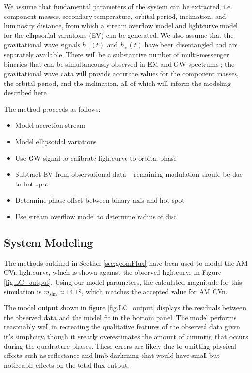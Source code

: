 \documentclass[preprint2]{aastex}
\begin{document}
We assume that fundamental parameters of the system can be extracted,
i.e. component masses, secondary temperature, orbital period,
inclination, and luminosity distance, from which a stream overflow
model and lightcurve model for the ellipsoidal variations (EV) can
be generated. We also assume that the gravitational wave signals
$h_+(t)$ and $h_\times(t)$ have been disentangled and are separately
available. There will be a substantive number of multi-messenger 
binaries that can be simultaneously observed in EM and GW spectrums 
\citep{LLCN2013}; the gravitational wave data will provide accurate 
values for the component masses, the orbital period, and the 
inclination, all of which will inform the modeling described here.

The method proceeds as follows:
\begin{itemize}
   \item Model accretion stream
   
   \item Model ellipsoidal variations
   
   \item Use GW signal to calibrate lightcurve to orbital phase
   
   \item Subtract EV from observational data -- remaining modulation
   should be due to hot-spot
   
   \item Determine phase offset between binary axis and hot-spot
   
   \item Use stream overflow model to determine radius of disc
\end{itemize}


\subsection{System Modeling}
The methods outlined in Section \ref{sec:geomFlux} have been used to model the
AM CVn lightcurve, which is shown against the observed lightcurve in
Figure \ref{fig.LC_output}.  Using our model parameters, the
calculated magnitude for this simulation is $m_{\text{sim}} \approx
14.18$, which matches the accepted value for AM CVn.  

The model output shown in figure \ref{fig.LC_output} displays the residuals between the observed data and the model fit in the bottom panel. The model performs reasonably well in recreating the qualitative features of the observed data given it's simplicity, though it greatly overestimates the amount of dimming that occurs during the quadrature phases. These errors are likely due to omitting physical effects such as reflectance and limb darkening that would have small but noticeable effects on the total flux output. 
\end{document}
